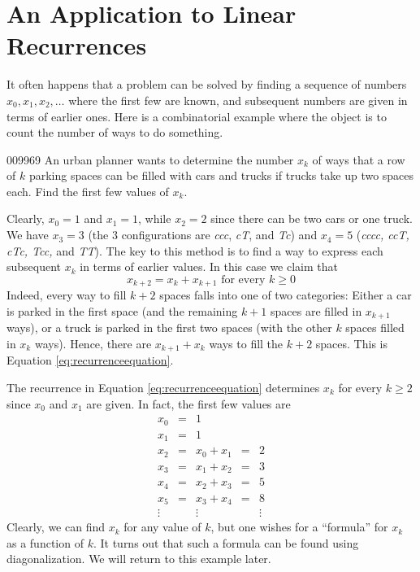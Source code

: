 \section{An Application to Linear Recurrences}
\label{sec:3_4}

It often happens that a problem can be solved by finding a sequence of numbers $x_{0}, x_{1}, x_{2}, \dots$  where the first few are known, and subsequent numbers are given in 
terms of earlier ones. Here is a combinatorial example where the object 
is to count the number of ways to do something.


\begin{example}{}{009969}
An urban planner wants to determine the number $x_{k}$ of ways that a row of $k$ parking spaces can be filled with cars and trucks if trucks take up two spaces each. Find the first few values of $x_{k}$.


\begin{solution}
  Clearly, $x_{0} = 1$ and $x_{1} = 1$, while $x_{2} = 2$ since there can be two cars or one truck. We have $x_{3} = 3$ (the $3$ configurations are \textit{ccc}, \textit{cT}, and \textit{Tc}) and $x_{4} = 5$ (\textit{cccc, ccT, cTc, Tcc,} and \textit{TT}). The key to this method is to find a way to express each subsequent $x_{k}$ in terms of earlier values. In this case we claim that
\begin{equation}\label{eq:recurrenceequation}
x_{k+2} = x_k + x_{k+1} \mbox{ for every } k \geq 0
\end{equation}
Indeed, every way to fill $k + 2$ spaces falls into one of two categories: Either a car is parked in the first space (and the remaining $k + 1$ spaces are filled in $x_{k+1}$ ways), or a truck is parked in the first two spaces (with the other $k$ spaces filled in $x_{k}$ ways). Hence, there are $x_{k+1} + x_{k}$ ways to fill the $k + 2$ spaces. This is Equation \ref{eq:recurrenceequation}.


The recurrence in Equation \ref{eq:recurrenceequation} determines $x_{k}$ for every $k \geq 2$ since $x_{0}$ and $x_{1}$ are given. In fact, the first few values are
\begin{equation*}
\begin{array}{cllll}
x_0 &=& 1 \\
x_1 &=& 1 \\
x_2 &=& x_0 + x_1 &=& 2 \\
x_3 &=& x_1 + x_2 &=& 3 \\
x_4 &=& x_2 + x_3 &=& 5 \\
x_5 &=& x_3 + x_4 &=& 8 \\
\vdots & &\vdots  & & \vdots
\end{array}
\end{equation*}
Clearly, we can find $x_{k}$ for any value of $k$, but one wishes for a ``formula'' for $x_{k}$ as a function of $k$. It turns out that such a formula can be found using diagonalization. We will return to this example later.
\end{solution}
\end{example}


